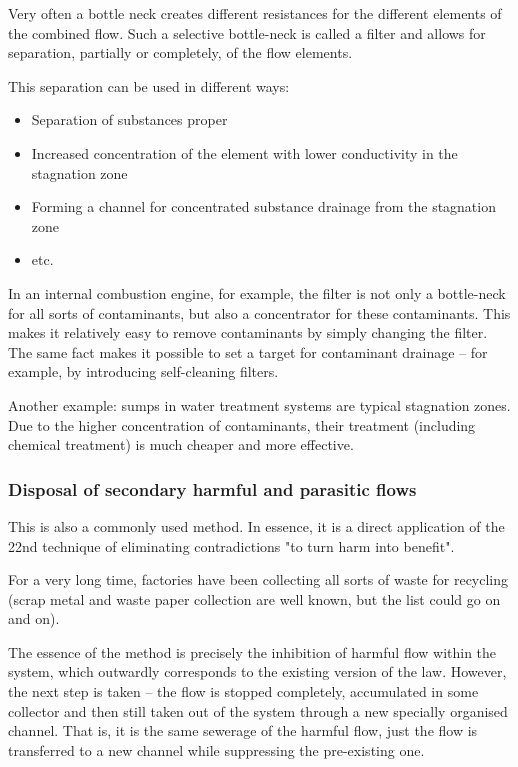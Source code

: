 \documentclass[a4paper,11pt]{article}
\begin{document}
Very often a bottle neck creates different resistances for the different
elements of the combined flow. Such a selective bottle-neck is called a filter
and allows for separation, partially or completely, of the flow elements.

This separation can be used in different ways:
\begin{itemize}
\item Separation of substances proper
\item Increased concentration of the element with lower conductivity in the
  stagnation zone
\item Forming a channel for concentrated substance drainage from the
  stagnation zone
\item etc.
\end{itemize}
In an internal combustion engine, for example, the filter is not only a
bottle-neck for all sorts of contaminants, but also a concentrator for these
contaminants. This makes it relatively easy to remove contaminants by simply
changing the filter. The same fact makes it possible to set a target for
contaminant drainage -- for example, by introducing self-cleaning filters.

Another example: sumps in water treatment systems are typical stagnation
zones. Due to the higher concentration of contaminants, their treatment
(including chemical treatment) is much cheaper and more effective.

\subsubsection{Disposal of secondary harmful and parasitic flows}

This is also a commonly used method. In essence, it is a direct application of
the 22nd technique of eliminating contradictions "to turn harm into benefit".

For a very long time, factories have been collecting all sorts of waste for
recycling (scrap metal and waste paper collection are well known, but the list
could go on and on).

The essence of the method is precisely the inhibition of harmful flow within
the system, which outwardly corresponds to the existing version of the law.
However, the next step is taken -- the flow is stopped completely, accumulated
in some collector and then still taken out of the system through a new
specially organised channel. That is, it is the same sewerage of the harmful
flow, just the flow is transferred to a new channel while suppressing the
pre-existing one.
\end{document}
